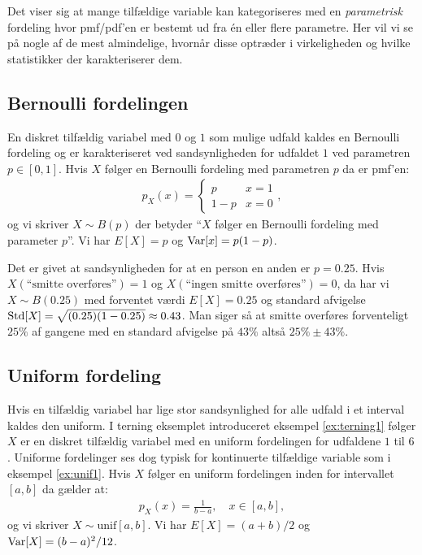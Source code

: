 Det viser sig at mange tilfældige variable kan kategoriseres med en \emph{parametrisk} fordeling hvor pmf/pdf'en er bestemt ud fra én eller flere parametre. Her vil vi se på nogle af de mest almindelige, hvornår disse optræder i virkeligheden og hvilke statistikker der karakteriserer dem. 
\subsection{Bernoulli fordelingen}
En diskret tilfældig variabel med $0$ og $1$ som mulige udfald kaldes en Bernoulli fordeling og er karakteriseret ved sandsynligheden for udfaldet $1$ ved parametren $p \in [0,1]$. Hvis $X$ følger en Bernoulli fordeling med parametren $p$ da er pmf'en:
\begin{align*}
p_X(x) = \begin{cases} p & x = 1 \\
1 - p & x = 0 
\end{cases},
\end{align*} 
og vi skriver $X \sim B(p)$ der betyder ``$X$ følger en Bernoulli fordeling med parameter $p$''. Vi har $E[X] = p$ og $\operatorname{Var}[x] = p(1-p)$. 
\begin{example}
Det er givet at sandsynligheden for at en person en anden er $p = 0.25$.  
Hvis  $X(\text{``smitte overføres''}) = 1$ og $X(\text{``ingen smitte overføres''}) = 0$, da har vi $X \sim B(0.25)$ med forventet værdi $E[X] = 0.25$ og standard afvigelse $\operatorname*{Std}[X] = \sqrt{(0.25)(1-0.25)} \approx 0.43$. Man siger så at smitte overføres forventeligt $25\%$ af gangene med en standard afvigelse på $43\%$ altså $25\% \pm 43\%$. 
\end{example}
\subsection{Uniform fordeling}
Hvis en tilfældig variabel har lige stor sandsynlighed for alle udfald i et interval kaldes den uniform. I terning eksemplet introduceret eksempel \ref{ex:terning1} følger $X$ er en diskret tilfældig variabel med en uniform fordelingen for udfaldene $1$ til $6$. Uniforme fordelinger ses dog typisk for kontinuerte tilfældige variable som i eksempel \ref{ex:unif1}. Hvis $X$ følger en uniform fordelingen inden for intervallet $[a,b]$ da gælder at:
\begin{align*}
p_X(x) = \frac{1}{b-a}, \quad x \in [a,b],
\end{align*}
og vi skriver $X \sim \text{unif}[a,b]$. Vi har $E[X] = (a+b)/2$ og $\operatorname{Var}[X] = (b-a)^2/12$. 
